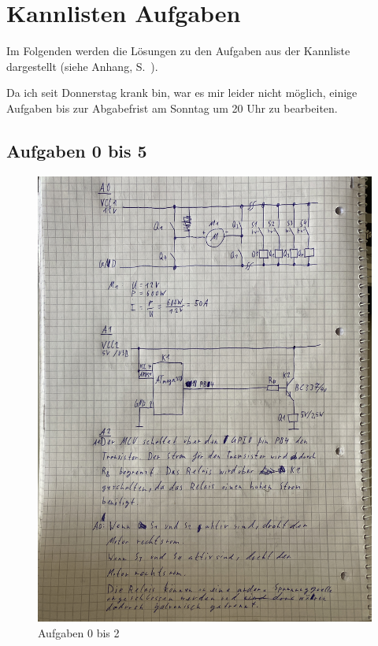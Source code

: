 \documentclass{article}
\begin{document}
\section{Kannlisten Aufgaben}

Im Folgenden werden die Lösungen zu den Aufgaben aus der Kannliste dargestellt (siehe Anhang, S.~\pageref{sec:Anhang}).

Da ich seit Donnerstag krank bin, war es mir leider nicht möglich,
einige Aufgaben bis zur Abgabefrist am Sonntag um 20 Uhr zu bearbeiten.

\subsection{Aufgaben 0 bis 5}

\begin{figure}[H]
    \centering
    \includegraphics[width=0.61\linewidth]{A0_to_A2.jpg}
    \caption{Aufgaben 0 bis 2}
\end{figure}
\end{document}
